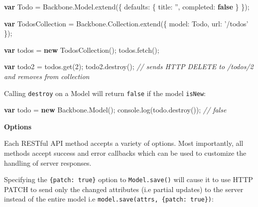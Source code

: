 \documentclass[9pt]{book}
\newenvironment{Shaded}{}{}
\newcommand{\KeywordTok}[1]{\textcolor[rgb]{0.00,0.44,0.13}{\textbf{{#1}}}}
\newcommand{\DataTypeTok}[1]{\textcolor[rgb]{0.56,0.13,0.00}{{#1}}}
\newcommand{\DecValTok}[1]{\textcolor[rgb]{0.25,0.63,0.44}{{#1}}}
\newcommand{\StringTok}[1]{\textcolor[rgb]{0.25,0.44,0.63}{{#1}}}
\newcommand{\CommentTok}[1]{\textcolor[rgb]{0.38,0.63,0.69}{\textit{{#1}}}}
\newcommand{\OtherTok}[1]{\textcolor[rgb]{0.00,0.44,0.13}{{#1}}}
\newcommand{\FunctionTok}[1]{\textcolor[rgb]{0.02,0.16,0.49}{{#1}}}
\newcommand{\NormalTok}[1]{{#1}}
\begin{document}
\begin{Shaded}
\begin{Highlighting}[]
\KeywordTok{var} \NormalTok{Todo = }\OtherTok{Backbone}\NormalTok{.}\OtherTok{Model}\NormalTok{.}\FunctionTok{extend}\NormalTok{(\{}
  \DataTypeTok{defaults}\NormalTok{: \{}
    \DataTypeTok{title}\NormalTok{: }\StringTok{''}\NormalTok{,}
    \DataTypeTok{completed}\NormalTok{: }\KeywordTok{false}
  \NormalTok{\}}
\NormalTok{\});}

\KeywordTok{var} \NormalTok{TodosCollection = }\OtherTok{Backbone}\NormalTok{.}\OtherTok{Collection}\NormalTok{.}\FunctionTok{extend}\NormalTok{(\{}
  \DataTypeTok{model}\NormalTok{: Todo,}
  \DataTypeTok{url}\NormalTok{: }\StringTok{'/todos'}
\NormalTok{\});}

\KeywordTok{var} \NormalTok{todos = }\KeywordTok{new} \FunctionTok{TodosCollection}\NormalTok{();}
\OtherTok{todos}\NormalTok{.}\FunctionTok{fetch}\NormalTok{();}

\KeywordTok{var} \NormalTok{todo2 = }\OtherTok{todos}\NormalTok{.}\FunctionTok{get}\NormalTok{(}\DecValTok{2}\NormalTok{);}
\OtherTok{todo2}\NormalTok{.}\FunctionTok{destroy}\NormalTok{(); }\CommentTok{// sends HTTP DELETE to /todos/2 and removes from collection}
\end{Highlighting}
\end{Shaded}

Calling \texttt{destroy} on a Model will return \texttt{false} if the
model \texttt{isNew}:

\begin{Shaded}
\begin{Highlighting}[]
\KeywordTok{var} \NormalTok{todo = }\KeywordTok{new} \OtherTok{Backbone}\NormalTok{.}\FunctionTok{Model}\NormalTok{();}
\OtherTok{console}\NormalTok{.}\FunctionTok{log}\NormalTok{(}\OtherTok{todo}\NormalTok{.}\FunctionTok{destroy}\NormalTok{());}
\CommentTok{// false}
\end{Highlighting}
\end{Shaded}

\textbf{Options}

Each RESTful API method accepts a variety of options. Most importantly,
all methods accept success and error callbacks which can be used to
customize the handling of server responses.

Specifying the \texttt{\{patch: true\}} option to \texttt{Model.save()}
will cause it to use HTTP PATCH to send only the changed attributes (i.e
partial updates) to the server instead of the entire model i.e
\texttt{model.save(attrs, \{patch: true\})}:
\end{document}
